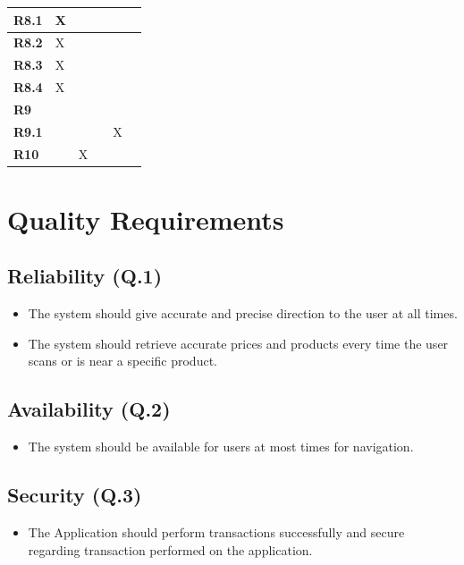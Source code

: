 \documentclass{article}
\begin{document}
\begin{center}
\begin{tabular}{ |p{1cm}|>{\centering}p{2.5cm}|>{\centering}p{2cm}|>{\centering}p{2.6cm}|>{\centering}p{2cm}|>{\centering}p{3.3cm}| }
             \hline
             \textbf{R8.1} &X & & & & \\
             \hline
             \textbf{R8.2} &X & & & & \\
             \hline
             \textbf{R8.3} &X & & & & \\
             \hline
             \textbf{R8.4} &X & & & & \\
             \hline
             \textbf{R9} & & & & & \\
             \hline
             \textbf{R9.1} & & & &X & \\
             \hline
             \textbf{R10} & &X & & & \\
             \hline
        \end{tabular}
    \end{center}


\section{Quality Requirements}
    \subsection{Reliability (Q.1)}
    \begin{itemize}
         \item The system should give accurate and precise direction to the user at all times.
        \item The system should retrieve accurate prices and products every time the user scans or is near a specific product.
    \end{itemize}
    
    \subsection{Availability (Q.2)}
    \begin{itemize}
        \item The system should be available for users at most times for navigation. 
    \end{itemize}
    
    \subsection{Security (Q.3)}
    \begin{itemize}
        \item The Application should perform transactions successfully and secure regarding transaction performed on the application.
    \end{itemize}
    
\end{document}
